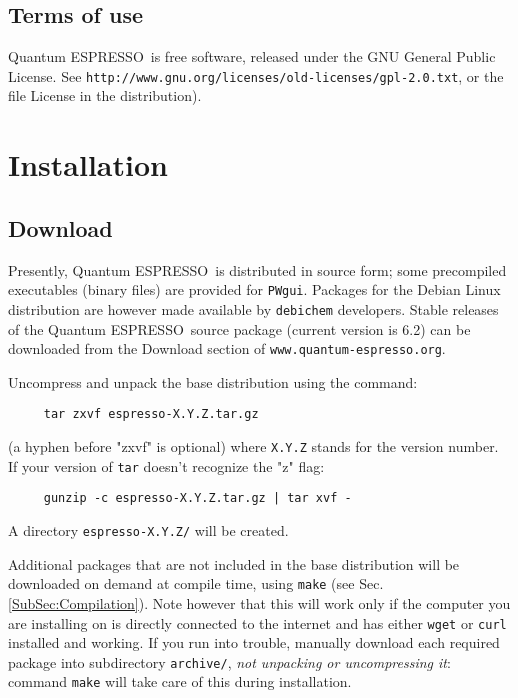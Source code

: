 \documentclass[12pt,a4paper]{article}
\def\version{6.2}
\def\qe{{\sc Quantum ESPRESSO}}
\begin{document}
\subsection{Terms of use}
\label{SubSec:Terms}

\qe\ is free software, released under the
GNU General Public License. See
\texttt{http://www.gnu.org/licenses/old-licenses/gpl-2.0.txt},
or the file License in the distribution).


\section{Installation}

\subsection{Download}
\label{SubSec:Download}

Presently, \qe\ is distributed in source form; some precompiled
executables (binary files) are provided for \texttt{PWgui}.
Packages for the Debian Linux distribution are however
made available by \texttt{debichem} developers.
Stable releases of the \qe\ source package (current version
is \version) can be downloaded from the Download section
of \texttt{www.quantum-espresso.org}.

Uncompress and unpack the base distribution using the command:
\begin{verbatim}
     tar zxvf espresso-X.Y.Z.tar.gz
\end{verbatim}
(a hyphen before "zxvf" is optional) where \texttt{X.Y.Z} stands for the
version number. If your version of \texttt{tar}
doesn't recognize the "z" flag:
\begin{verbatim}
     gunzip -c espresso-X.Y.Z.tar.gz | tar xvf -
\end{verbatim}
A directory \texttt{espresso-X.Y.Z/} will be created.

Additional packages that are not included in the base distribution
will be downloaded on demand at compile time, using \texttt{make}
(see Sec.\ref{SubSec:Compilation}).
Note however that this will work only if the computer you are
installing on is directly connected to the internet and has
either \texttt{wget} or \texttt{curl} installed and working.
If you run into trouble, manually download each required package
into subdirectory \texttt{archive/}, {\em not unpacking or
uncompressing it}:
command \texttt{make} will take care of this during installation.
\end{document}
